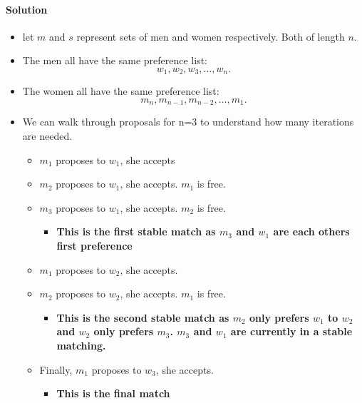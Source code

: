\documentclass[11pt]{article}
\begin{document}
\begin{enumerate}
\begin{enumerate}
\paragraph{Solution} 
    \begin{itemize}
        \item let $m$ and $s$ represent sets of men and women respectively. Both of length $n$.
        \item The men all have the same preference list:
            \[
            w_{1}, w_{2}, w_{3}, \ldots, w_{n}
            .\] 
        \item The women all have the same preference list:
            \[
            m_{n}, m_{n-1}, m_{n-2}, \ldots, m_{1}
            .\] 
        \item We can walk through proposals for n=3 to understand how many iterations are needed.
            \begin{itemize}
                \item $m_{1}$ proposes to $w_{1}$, she accepts
                \item $m_{2}$ proposes to $w_{1}$, she accepts. $m_{1}$ is free.
                \item $m_{3}$ proposes to $w_{1}$, she accepts. $m_{2}$ is free.
                \begin{itemize}
                    \item \textbf{This is the first stable match as $m_{3}$ and $w_{1}$ are each others first preference}
                \end{itemize}
                \item $m_{1}$ proposes to $w_{2}$, she accepts.
                \item $m_{2}$ proposes to $w_{2}$, she accepts. $m_{1}$ is free.
                \begin{itemize}
                    \item \textbf{This is the second stable match as $m_{2}$ only prefers $w_{1}$ to $w_{2}$ and $w_{2}$ only prefers $m_{3}$. $m_{3}$ and $w_{1}$ are currently in a stable matching.}
                \end{itemize}
                \item Finally, $m_{1}$ proposes to $w_{3}$, she accepts.
                \begin{itemize}
                    \item \textbf{This is the final match}
                \end{itemize}
            \end{itemize}

\end{itemize}
\end{enumerate}
\end{enumerate}
\end{document}

